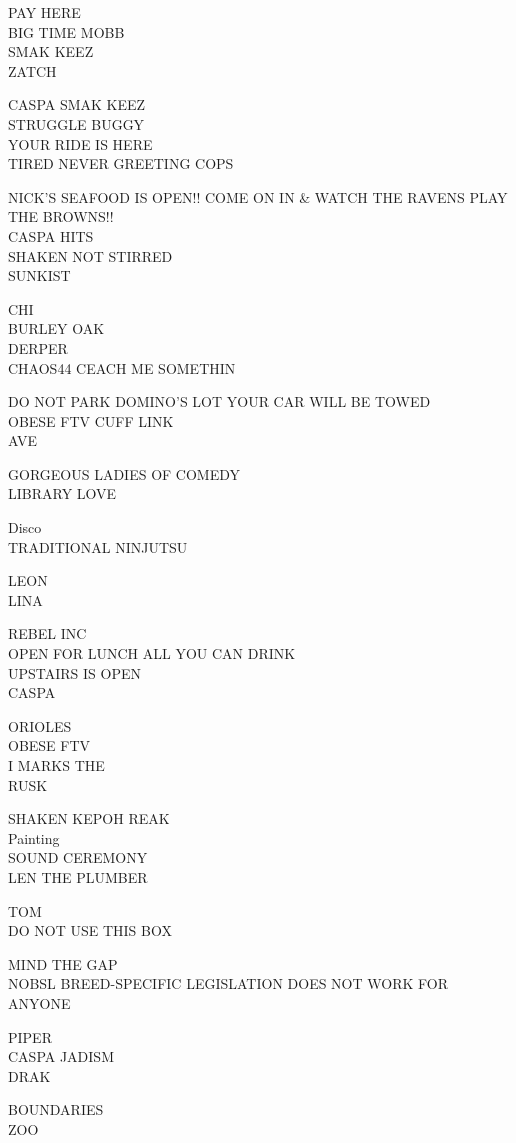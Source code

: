 \documentclass[10pt,letterpaper]{article}
\begin{document}
PAY HERE\\
BIG TIME MOBB\\
SMAK KEEZ\\
ZATCH

CASPA SMAK KEEZ\\
STRUGGLE BUGGY\\
YOUR RIDE IS HERE\\
TIRED NEVER GREETING COPS

NICK'S SEAFOOD IS OPEN!! COME ON IN \& WATCH THE RAVENS PLAY THE BROWNS!!\\
CASPA HITS\\
SHAKEN NOT STIRRED\\
SUNKIST

CHI\\
BURLEY OAK\\
DERPER\\
CHAOS44 CEACH ME SOMETHIN

DO NOT PARK DOMINO'S LOT YOUR CAR WILL BE TOWED\\
OBESE FTV CUFF LINK\\
AVE

GORGEOUS LADIES OF COMEDY\\
LIBRARY LOVE

Disco\\
TRADITIONAL NINJUTSU

LEON\\
LINA

REBEL INC\\
OPEN FOR LUNCH ALL YOU CAN DRINK\\
UPSTAIRS IS OPEN\\
CASPA

ORIOLES\\
OBESE FTV\\
I MARKS THE\\
RUSK

SHAKEN KEPOH REAK\\
Painting\\
SOUND CEREMONY\\
LEN THE PLUMBER

TOM\\
DO NOT USE THIS BOX

MIND THE GAP\\
NOBSL BREED{-}SPECIFIC LEGISLATION DOES NOT WORK FOR ANYONE

PIPER\\
CASPA JADISM\\
DRAK

BOUNDARIES\\
ZOO
\end{document}
